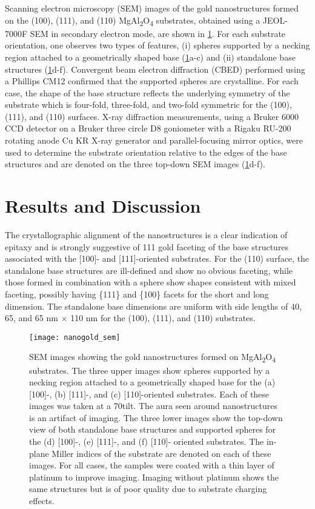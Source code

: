 Scanning electron microscopy (SEM) images of the gold nanostructures formed on the (100), (111), and (110) MgAl\textsubscript{2}O\textsubscript{4} substrates, obtained using a JEOL-7000F SEM in secondary electron mode, are shown in \cref{fig:nanogold_sem}.
For each substrate orientation, one observes two types of features, (i) spheres supported by a necking region attached to a geometrically shaped base (\cref{fig:nanogold_sem}a-c) and (ii) standalone base structures (\cref{fig:nanogold_sem}d-f).
Convergent beam electron diffraction (CBED) performed using a Phillips CM12 confirmed that the supported spheres are crystalline.
For each case, the shape of the base structure reflects the underlying symmetry of the substrate which is four-fold, three-fold, and two-fold symmetric for the (100), (111), and (110) surfaces.
X-ray diffraction measurements, using a Bruker 6000 CCD detector on a Bruker three circle D8 goniometer with a Rigaku RU-200 rotating anode Cu KR X-ray generator and parallel-focusing mirror optics, were used to determine the substrate orientation relative to the edges of the base structures and are denoted on the three top-down SEM images (\cref{fig:nanogold_sem}d-f).
\section{Results and Discussion}
The crystallographic alignment of the nanostructures is a clear indication of epitaxy and is strongly suggestive of {111} gold faceting of the base structures associated with the [100]- and [111]-oriented substrates.
For the (110) surface, the standalone base structures are ill-defined and show no obvious faceting, while those formed in combination with a sphere show shapes consistent with mixed faceting, possibly having \{111\} and \{100\} facets for the short and long dimension.
The standalone base dimensions are uniform with side lengths of 40, 65, and 65 nm \(\times\) 110 nm for the (100), (111), and (110) substrates.
\begin{figure}
 \centering \texttt{[image: nanogold\_sem]}
 \caption[SEM images of gold nanostructures]{\label{fig:nanogold_sem}SEM images showing the gold nanostructures formed on MgAl\textsubscript{2}O\textsubscript{4} substrates.
  The three upper images show spheres supported by a necking region attached to a geometrically shaped base for the (a) [100]-, (b) [111]-, and (c) [110]-oriented substrates.
  Each of these images was taken at a 70\degree tilt.
  The aura seen around nanostructures is an artifact of imaging.
  The three lower images show the top-down view of both standalone base structures and supported spheres for the (d) [100]-, (e) [111]-, and (f) [110]- oriented substrates.
  The in-plane Miller indices of the substrate are denoted on each of these images.
  For all cases, the samples were coated with a thin layer of platinum to improve imaging.
  Imaging without platinum shows the same structures but is of poor quality due to substrate charging effects.}
\end{figure}


